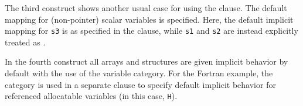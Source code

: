 The third  construct shows another usual case for using the
 clause.  The default mapping for (non-pointer) scalar
variables is specified.  Here, the default implicit mapping for \texttt{s3} is
 as specified in the  clause, while \texttt{s1}
and \texttt{s2} are instead explicitly treated as .

In the fourth  construct all arrays and structures are given
 implicit behavior by default with the use of the
 variable category.  For the Fortran example, the
 category is used in a separate  clause to
specify default  implicit behavior for referenced
allocatable variables (in this case, \texttt{H}).



